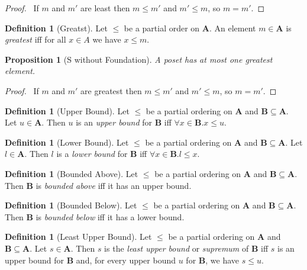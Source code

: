 \documentclass{book}
\let\qed\relax
\newtheorem{prop}[ax]{Proposition}
\theoremstyle{definition}
\newtheorem{df}[ax]{Definition}
\begin{document}
\begin{proof}
\pf\ If $m$ and $m'$ are least then $m \leq m'$ and $m' \leq m$, so $m = m'$. \qed
\end{proof}

\begin{df}[Greatst]
Let $\leq$ be a partial order on $\mathbf{A}$. An element $m \in \mathbf{A}$ is \emph{greatest} iff for all $x \in A$ we have $x \leq m$.
\end{df}

\begin{prop}[S without Foundation]
A poset has at most one greatest element.
\end{prop}

\begin{proof}
\pf\ If $m$ and $m'$ are greatest then $m \leq m'$ and $m' \leq m$, so $m = m'$. \qed
\end{proof}

\begin{df}[Upper Bound]
Let $\leq$ be a partial ordering on $\mathbf{A}$ and $\mathbf{B} \subseteq \mathbf{A}$. Let $u \in \mathbf{A}$. Then $u$ is an \emph{upper bound} for $\mathbf{B}$ iff $\forall x \in \mathbf{B}. x \leq u$.
\end{df}

\begin{df}[Lower Bound]
Let $\leq$ be a partial ordering on $\mathbf{A}$ and $\mathbf{B} \subseteq \mathbf{A}$. Let $l \in \mathbf{A}$. Then $l$ is a \emph{lower bound} for $\mathbf{B}$ iff $\forall x \in \mathbf{B}. l \leq x$.
\end{df}

\begin{df}[Bounded Above]
Let $\leq$ be a partial ordering on $\mathbf{A}$ and $\mathbf{B} \subseteq \mathbf{A}$. Then $\mathbf{B}$ is \emph{bounded above} iff it has an upper bound.
\end{df}

\begin{df}[Bounded Below]
Let $\leq$ be a partial ordering on $\mathbf{A}$ and $\mathbf{B} \subseteq \mathbf{A}$. Then $\mathbf{B}$ is \emph{bounded below} iff it has a lower bound.
\end{df}

\begin{df}[Least Upper Bound]
Let $\leq$ be a partial ordering on $\mathbf{A}$ and $\mathbf{B} \subseteq \mathbf{A}$. Let $s \in \mathbf{A}$. Then $s$ is the \emph{least upper bound} or \emph{supremum} of $\mathbf{B}$ iff $s$ is an upper bound for $\mathbf{B}$ and, for every upper bound $u$ for $\mathbf{B}$, we have $s \leq u$.
\end{df}
\end{document}
